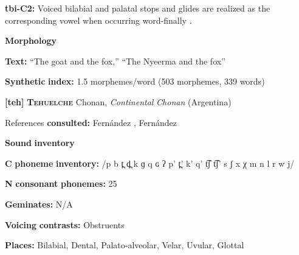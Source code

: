 \begin{styleBody}
\textbf{tbi-C2:} Voiced bilabial and palatal stops and glides are realized as the corresponding vowel when occurring word-finally \citep{Stirtz2011}.
\end{styleBody}

\begin{styleBody}
\textbf{Morphology}
\end{styleBody}

\begin{styleBody}
\textbf{Text:} “The goat and the fox,” “The Nyeerma and the fox” \citep[319-326]{Stirtz2011}
\end{styleBody}

\begin{styleBody}
\textbf{Synthetic} \textbf{index:} 1.5 morphemes/word (503 morphemes, 339 words)
\end{styleBody}

\begin{styleBody}
\textbf{[teh]}   \textbf{\textsc{Tehuelche}}  Chonan, \textit{Continental} \textit{Chonan} (Argentina)
\end{styleBody}

\begin{styleBody}
References \textbf{consulted:} Fernández \citet{Garay1998}, Fernández \citet{GarayHernández2006}
\end{styleBody}

\begin{styleBody}
\textbf{Sound} \textbf{inventory}
\end{styleBody}

\begin{styleBody}
\textbf{C} \textbf{phoneme} \textbf{inventory:} /p b t̪ d̪ k ɡ q ɢ ʔ p’ t̪’ k’ q’ t͡ʃ t͡ʃ’ s ʃ x χ m n l r w j/
\end{styleBody}

\begin{styleBody}
\textbf{N} \textbf{consonant} \textbf{phonemes:} 25
\end{styleBody}

\begin{styleBody}
\textbf{Geminates:} N/A
\end{styleBody}

\begin{styleBody}
\textbf{Voicing} \textbf{contrasts:} Obstruents
\end{styleBody}

\begin{styleBody}
\textbf{Places:} Bilabial, Dental, Palato-alveolar, Velar, Uvular, Glottal
\end{styleBody}

